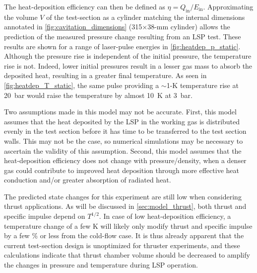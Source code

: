                 The heat-deposition efficiency can then be defined as $\eta = Q_\mathrm{in}/E_\mathrm{in}$. Approximating the volume $V$ of the test-section as a cylinder matching the internal dimensions annotated in \autoref{fig:cavitation_dimensions} (315$\times$38-\unit{mm} cylinder) allows the prediction of the measured pressure change resulting from an LSP test. These results are shown for a range of laser-pulse energies in \autoref{fig:heatdep_p_static}. Although the pressure rise is independent of the initial pressure, the temperature rise is not. Indeed, lower initial pressures result in a lesser gas mass to absorb the deposited heat, resulting in a greater final temperature. As seen in \autoref{fig:heatdep_T_static}, the same pulse providing a $\sim$1-K temperature rise at \qty{20}{bar} would raise the temperature by almost \qty{10}{K} at \qty{3}{bar}.

                Two assumptions made in this model may not be accurate. First, this model assumes that the heat deposited by the LSP in the working gas is distributed evenly in the test section before it has time to be transferred to the test section walls. This may not be the case, so numerical simulations may be necessary to ascertain the validity of this assumption. Second, this model assumes that the heat-deposition efficiency does not change with pressure/density, when a denser gas could contribute to improved heat deposition through more effective heat conduction and/or greater absorption of radiated heat.

                The predicted state changes for this experiment are still low when considering thrust applications. As will be discussed in \autoref{sec:model_thrust}, both thrust and specific impulse depend on $T^{1/2}$. In case of low heat-deposition efficiency, a temperature change of a few K will likely only modify thrust and specific impulse by a few \% or less from the cold-flow case. It is thus already apparent that the current test-section design is unoptimized for thruster experiments, and these calculations indicate that thrust chamber volume should be decreased to amplify the changes in pressure and temperature during LSP operation.

